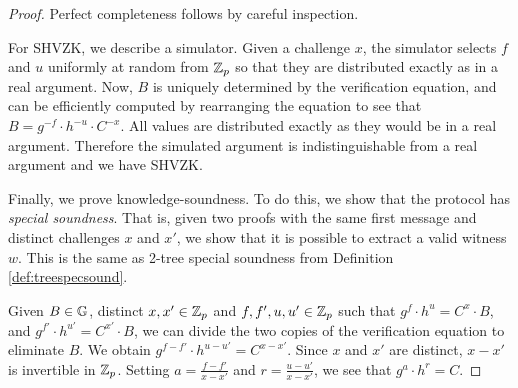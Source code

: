 \begin{proof} Perfect completeness follows by careful inspection.

For SHVZK, we describe a simulator. Given a challenge $x$, the simulator selects $f$ and $u$ uniformly at random from $\mathbb{Z}_p$ so that they are distributed exactly as in a real argument. Now, $B$ is uniquely determined by the verification equation, and can be efficiently computed by rearranging the equation to see that $B = g^{-f} \cdot h^{-u} \cdot C^{-x}$. All values are distributed exactly as they would be in a real argument. Therefore the simulated argument is indistinguishable from a real argument and we have SHVZK.

Finally, we prove knowledge-soundness. To do this, we show that the protocol has \emph{special soundness}. That is, given two proofs with the same first message and distinct challenges $x$ and $x'$, we show that it is possible to extract a valid witness $w$. This is the same as 2-tree special soundness from Definition \ref{def:treespecsound}.

Given $B \in \mathbb{G}$, distinct $x,x' \in \mathbb{Z}_p$ and $f,f',u,u' \in \mathbb{Z}_p$ such that $g^f \cdot h^u = C^x \cdot B$, and $g^{f'} \cdot h^{u'} = C^{x'} \cdot B$, we can divide the two copies of the verification equation to eliminate $B$. We obtain $g^{f-f'}  \cdot h^{u-u'}= C^{x-x'}$. Since $x$ and $x'$ are distinct, $x-x'$ is invertible in $\mathbb{Z}_p$. Setting $a = \frac{f-f'}{x-x'}$ and $r = \frac{u-u'}{x-x'}$, we see that $g^a \cdot h^r = C$.


\end{proof}
